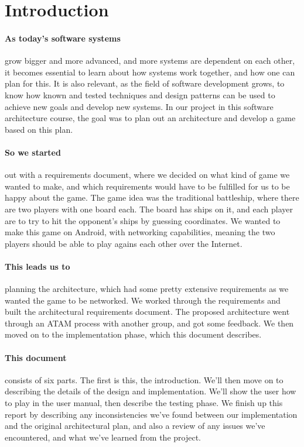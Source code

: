 \section{Introduction}

\paragraph{As today's software systems} grow bigger and more advanced, and more systems are dependent on each other, it becomes essential to learn about how systems work together, and how one can plan for this. It is also relevant, as the field of software development grows, to know how known and tested techniques and design patterns can be used to achieve new goals and develop new systems. In our project in this software architecture course, the goal was to plan out an architecture and develop a game based on this plan.

\paragraph{So we started} out with a requirements document, where we decided on what kind of game we wanted to make, and which requirements would have to be fulfilled for us to be happy about the game. The game idea was the traditional battleship, where there are two players with one board each. The board has ships on it, and each player are to try to hit the opponent's ships by guessing coordinates. We wanted to make this game on Android, with networking capabilities, meaning the two players should be able to play agains each other over the Internet. 


\paragraph{This leads us to} planning the architecture, which had some pretty extensive requirements as we wanted the game to be networked. We worked through the requirements and built the architectural requirements document. The proposed architecture went through an ATAM process with another group, and got some feedback. We then moved on to the implementation phase, which this document describes.

\paragraph{This document} consists of six parts. The first is this, the introduction. We'll then move on to describing the details of the design and implementation. We'll show the user how to play in the user manual, then describe the testing phase. We finish up this report by describing any inconsistencies we've found between our implementation and the original architectural plan, and also a review of any issues we've encountered, and what we've learned from the project.

